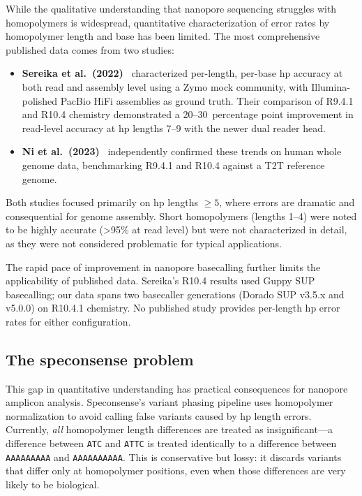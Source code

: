 \documentclass[11pt]{article}
\begin{document}
While the qualitative understanding that nanopore sequencing struggles with
homopolymers is widespread, quantitative characterization of error rates by
homopolymer length and base has been limited. The most comprehensive published
data comes from two studies:

\begin{itemize}
\item \textbf{Sereika et al.\ (2022)}~\cite{sereika2022} characterized
  per-length, per-base hp accuracy at both read and assembly level using a Zymo
  mock community, with Illumina-polished PacBio HiFi assemblies as ground
  truth. Their comparison of R9.4.1 and R10.4 chemistry demonstrated a
  20--30~percentage point improvement in read-level accuracy at hp lengths 7--9
  with the newer dual reader head.

\item \textbf{Ni et al.\ (2023)}~\cite{ni2023} independently confirmed these
  trends on human whole genome data, benchmarking R9.4.1 and R10.4 against a
  T2T reference genome.
\end{itemize}

Both studies focused primarily on hp lengths $\geq 5$, where errors are
dramatic and consequential for genome assembly. Short homopolymers (lengths
1--4) were noted to be highly accurate ({>}95\% at read level) but were not
characterized in detail, as they were not considered problematic for typical
applications.

The rapid pace of improvement in nanopore basecalling further limits the
applicability of published data. Sereika's R10.4 results used Guppy SUP
basecalling; our data spans two basecaller generations (Dorado SUP v3.5.x and
v5.0.0) on R10.4.1 chemistry. No published study provides per-length hp error
rates for either configuration.

\subsection{The speconsense problem}

This gap in quantitative understanding has practical consequences for nanopore
amplicon analysis. Speconsense's variant phasing pipeline uses homopolymer
normalization to avoid calling false variants caused by hp length errors.
Currently, \emph{all} homopolymer length differences are treated as
insignificant---a difference between \texttt{ATC} and \texttt{ATTC} is treated
identically to a difference between \texttt{AAAAAAAAA} and
\texttt{AAAAAAAAAA}. This is conservative but lossy: it discards variants that
differ only at homopolymer positions, even when those differences are very
likely to be biological.
\end{document}
